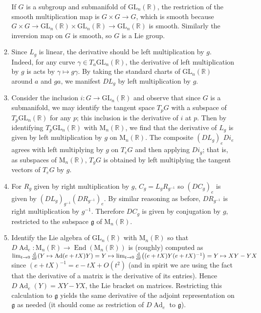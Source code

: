 \documentclass[11pt,leqno]{article}
\theoremstyle{plain}
\theoremstyle{definition}
\numberwithin{equation}{section}
\numberwithin{lem}{section}
\DeclareMathOperator{\Ad}{Ad}
\DeclareMathOperator{\End}{End}
\newcommand{\GL}{\mathrm{GL}}
\newcommand{\Mat}{\mathrm{M}}
\begin{document}
\begin{enumerate}
\begin{enumerate}
      If $G$ is a subgroup and submanifold of $\GL_n(\mathbb R)$, the restriction of the smooth multiplication map is $G\times G\to G$, which is smooth because $G\times G\to \GL_n(\mathbb R)\times \GL_n(\mathbb R)\to \GL_n(\mathbb R)$ is smooth. Similarly the inversion map on $G$ is smooth, so $G$ is a Lie group.
      \item Since $L_g$ is linear, the derivative should be left multiplication by $g$. Indeed, for any curve $\gamma\in T_a\GL_n(\mathbb R)$, the derivative of left multiplication by $g$ is acts by $\gamma\mapsto g\gamma$. By taking the standard charts of $\GL_n(\mathbb R)$ around $a$ and $ga$, we manifest $DL_g$ by left multiplication by $g$.
      \item Consider the inclusion $i\colon G\to \GL_n(\mathbb R)$ and observe that since $G$ is a submanifold, we may identify the tangent space $T_pG$ with a subspace of $T_p\GL_n(\mathbb R)$ for any $p$; this inclusion is the derivative of $i$ at $p$. Then by identifying $T_p\GL_n(\mathbb R)$ with $\Mat_n(\mathbb R)$, we find that the derivative of $L_g$ is given by left multiplication by $g$ on $\Mat_n(\mathbb R)$. The composite $(DL_g)_e Di_e$ agrees with left multiplying by $g$ on $T_eG$ and then applying $Di_g$; that is, as subspaces of $\Mat_n(\mathbb R)$, $T_gG$ is obtained by left multiplying the tangent vectors of $T_eG$ by $g$.
      \item For $R_g$ given by right multiplication by $g$, $C_g = L_gR_{g^{-1}}$ so $(DC_g)_e$ is given by $(DL_g)_{g^{-1}}(DR_{g^{-1}})_e$. By similar reasoning as before, $DR_{g^{-1}}$ is right multiplication by $g^{-1}$. Therefore $DC_g$ is given by conjugation by $g$, restricted to the subspace $\mathfrak g$ of $\Mat_n(\mathbb R)$.
      \item Identify the Lie algebra of $\GL_n(\mathbb R)$ with $\Mat_n(\mathbb R)$ so that $D\Ad_e\colon \Mat_n(\mathbb R)\to \End(\Mat_n(\mathbb R))$ is (roughly) computed as $\lim_{t\to 0}\dv{t}(Y\mapsto\Ad(e+tX)Y) = Y\mapsto \lim_{t\to 0}\dv{t}((e+tX)Y(e+tX)^{-1}) = Y\mapsto XY-YX$ since $(e+tX)^{-1} = e-tX + O(t^2)$ (and in spirit we are using the fact that the derivative of a matrix is the derivative of its entries). Hence $D\Ad_e(Y) = XY-YX$, the Lie bracket on matrices. Restricting this calculation to $\mathfrak g$ yields the same derivative of the adjoint representation on $\mathfrak g$ as needed (it should come as restriction of $D\Ad_e$ to $\mathfrak g$).
    \end{enumerate}
\end{enumerate}
\end{document}

